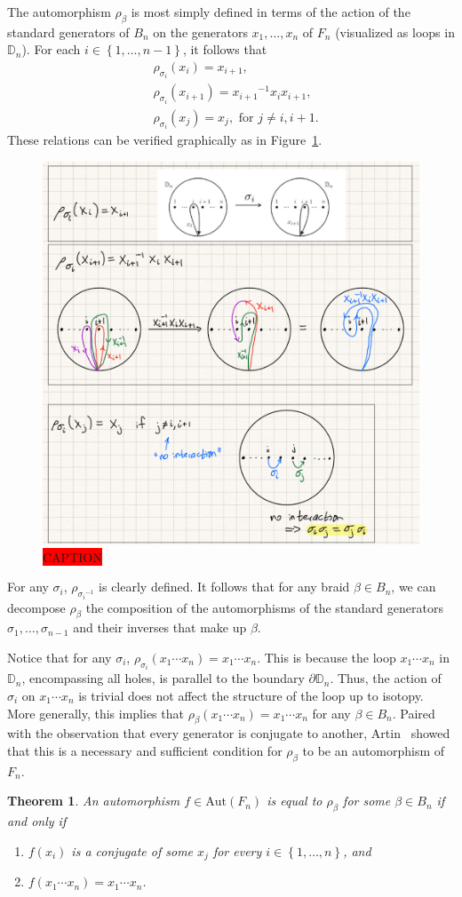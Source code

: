 \documentclass[12pt]{report}
\newcommand{\D}{\mathbb{D}}
\newcommand{\iv}[1]{{ #1 }^{-1}}
\newcommand{\aut}[1]{\textrm{Aut}\!\left( #1 \right)}
\newtheorem{theorem}{Theorem}[chapter]
\theoremstyle{definition}
\begin{document}
The automorphism $\rho_\beta$ is most simply defined in terms of the action of the standard generators of $B_n$ on the generators $x_1,\dots,x_n$ of $F_n$ (visualized as loops in $\D_n$). For each $i\in\left\{ 1,\dots,n-1 \right\}$, it follows that
\begin{align}
    &\rho_{\sigma_i}(x_i) = x_{i+1}, \\
    &\rho_{\sigma_i}(x_{i+1}) = \iv{x_{i+1}}x_i x_{i+1}, \\
    &\rho_{\sigma_i}(x_j) = x_j, \textrm{ for } j\neq i,i+1.
\end{align}
These relations can be verified graphically as in Figure~\ref{fig:sigma_on_x_i}.
\begin{figure}[htbp]
    \centering
    \includegraphics[width = .5\textwidth]{sketch_sigma_on_x_i.png}
    \caption{\colorbox{red}{CAPTION}}\label{fig:sigma_on_x_i}
\end{figure}
For any $\sigma_i$, $\rho_{\iv{\sigma_i}}$ is clearly defined. It follows that for any braid $\beta\in B_n$, we can decompose $\rho_\beta$ the composition of the automorphisms of the standard generators $\sigma_1,\dots,\sigma_{n-1}$ and their inverses that make up $\beta$. 

Notice that for any $\sigma_i$, $\rho_{\sigma_i}(x_1\cdots x_n) = x_1\cdots x_n$. This is because the loop $x_1\cdots x_n$ in $\D_n$, encompassing all holes, is parallel to the boundary $\partial\D_n$. Thus, the action of $\sigma_i$ on $x_1\cdots x_n$ is trivial does not affect the structure of the loop up to isotopy. More generally, this implies that $\rho_\beta(x_1\cdots x_n) = x_1\cdots x_n$ for any $\beta\in B_n$. Paired with the observation that every generator is conjugate to another, Artin~\cite{Artin1947} showed that this is a necessary and sufficient condition for $\rho_\beta$ to be an automorphism of $F_n$.

\begin{theorem}
    An automorphism $f\in\aut{F_n}$ is equal to $\rho_\beta$ for some $\beta\in B_n$ if and only if
    \begin{enumerate}
        \item $f(x_i)$ is a conjugate of some $x_j$ for every $i\in\left\{ 1,\dots,n \right\}$, and
        \item $f(x_1\cdots x_n) = x_1\cdots x_n$.
    \end{enumerate}
\end{theorem}
\end{document}
